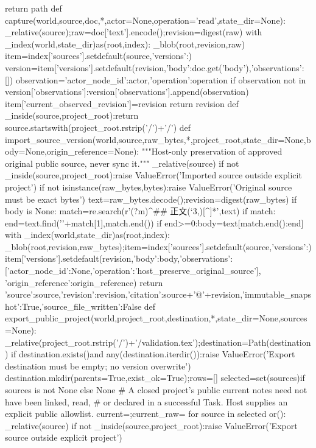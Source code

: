     return path
def capture(world,source,doc,*,actor=None,operation='read',state_dir=None):
    _relative(source);raw=doc['text'].encode();revision=digest(raw)
    with _index(world,state_dir)as(root,index):
        _blob(root,revision,raw)
        item=index['sources'].setdefault(source,{'versions':{}})
        version=item['versions'].setdefault(revision,{'body':doc.get('body'),'observations':[]})
        observation={'actor_node_id':actor,'operation':operation}
        if observation not in version['observations']:version['observations'].append(observation)
        item['current_observed_revision']=revision
    return revision
def _inside(source,project_root):return source.startswith(project_root.rstrip('/')+'/')
def import_source_version(world,source,raw_bytes,*,project_root,state_dir=None,body=None,origin_reference=None):
    """Host-only preservation of approved original public source, never sync it."""
    _relative(source)
    if not _inside(source,project_root):raise ValueError('Imported source outside explicit project')
    if not isinstance(raw_bytes,bytes):raise ValueError('Original source must be exact bytes')
    text=raw_bytes.decode();revision=digest(raw_bytes)
    if body is None:
        match=re.search(r'(?m)^## 正文\s*\n(`{3,})[^\n]*\n',text)
        if match:
            end=text.find('\n'+match[1],match.end())
            if end>=0:body=text[match.end():end]
    with _index(world,state_dir)as(root,index):
        _blob(root,revision,raw_bytes);item=index['sources'].setdefault(source,{'versions':{}})
        item['versions'].setdefault(revision,{'body':body,'observations':[{'actor_node_id':None,'operation':'host_preserve_original_source'}],
            'origin_reference':origin_reference})
    return {'source':source,'revision':revision,'citation':source+'@'+revision,'immutable_snapshot':True,'source_file_written':False}
def export_public_project(world,project_root,destination,*,state_dir=None,sources=None):
    _relative(project_root.rstrip('/')+'/validation.tex');destination=Path(destination)
    if destination.exists()and any(destination.iterdir()):raise ValueError('Export destination must be empty; no version overwrite')
    destination.mkdir(parents=True,exist_ok=True);rows=[]
    selected=set(sources)if sources is not None else None
    # A closed project's public current notes need not have been linked, read,
    # or declared in a successful Task. Host supplies an explicit public allowlist.
    current={};current_raw={}
    for source in selected or():
        _relative(source)
        if not _inside(source,project_root):raise ValueError('Export source outside explicit project')
